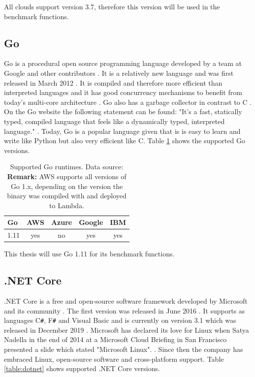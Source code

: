 All clouds support version 3.7, therefore this version will be used in the benchmark functions.

\subsection{Go}
Go is a procedural open source programming language developed by a team at Google and other contributors \cite{GoDoc, GoProject}. It is a relatively new language and was first released in March 2012 \cite{GoProject}. It is compiled and therefore more efficient than interpreted languages and it has good concurrency mechanisms to benefit from today's multi-core architecture \cite{GoDoc}. Go also has a garbage collector in contrast to C \cite{GoDoc}. On the Go website the following statement can be found: "It's a fast, statically typed, compiled language that feels like a dynamically typed, interpreted language." \cite{GoDoc}. Today, Go is a popular language given that is is easy to learn and write like Python but also very efficient like C. Table \ref{table:go} shows the supported Go versions.

\begin{table}[htp]
\centering
\captionsetup[table]{justification=centering, labelfont=bf}
\begin{tabular}{|l|c|c|c|c|} 
 \hline
 Go & AWS & Azure & Google & IBM \\ \hline
1.11  & \cellcolor{green!25}yes    & \cellcolor{red!25}no    & \cellcolor{green!25}yes  & \cellcolor{green!25}yes\\ \hline
\end{tabular}
\caption[Supported Go runtimes]{Supported Go runtimes. Data source: \cite{AWSLambdaLanguages, AzureFunctionsLanguages, GoogleFunctionsLanguages, IBMRuntimes}\\ \textbf{Remark:} AWS supports all versions of Go 1.x, depending on the version the binary was compiled with and deployed to Lambda.}
\label{table:go}
\end{table}

This thesis will use Go 1.11 for its benchmark functions.
\subsection{.NET Core}

.NET Core is a free and open-source software framework developed by Microsoft and its community \cite{.NETCore}. The first version was released in June 2016 \cite{.NETCoreReleases}. It supports as languages C\texttt{\#}, F\texttt{\#} and Visual Basic \cite{.NETAbout} and is currently on version 3.1 which was released in December 2019 \cite{.NETCoreBlog}. Microsoft has declared its love for Linux when Satya Nadella in the end of 2014 at a Microsoft Cloud Briefing in San Francisco presented a slide which stated "Microsoft  Linux". \cite{MicrosoftCloudBlog}. Since then the company has embraced Linux, open-source software and cross-platform support. Table \ref{table:dotnet} shows supported .NET Core versions.

